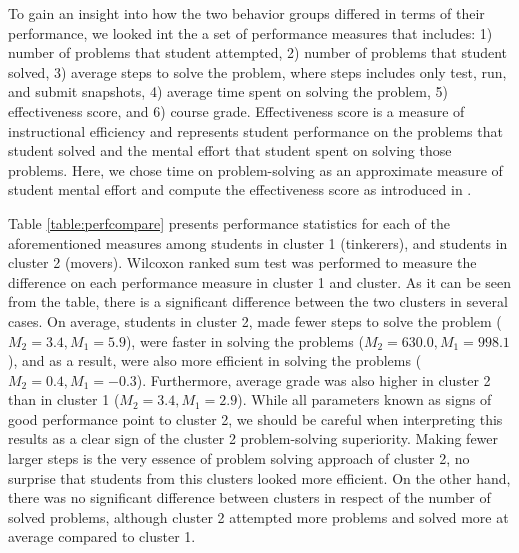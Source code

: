 \documentclass{sigchi}
\begin{document}
To gain an insight into how the two behavior groups differed in terms of their performance, we looked int the a set of performance measures that includes: 1) number of problems that student attempted, 2)  number of problems that student solved, 3) average steps to solve the problem, where steps includes only test, run, and submit snapshots, 4) average time spent on solving the problem, 5) effectiveness score, and 6) course grade. Effectiveness score is a measure of instructional efficiency and represents student performance on the problems that student solved and the mental effort that student spent on solving those problems. Here, we chose time on problem-solving as an approximate measure of student mental effort and compute the effectiveness score as introduced in \cite{paas1993efficiency}. 

Table \ref{table:perfcompare} presents performance statistics for each of the aforementioned measures among students in cluster 1 (tinkerers), and students in cluster 2 (movers).  Wilcoxon ranked sum test was performed to measure the difference on each performance measure in cluster 1 and cluster. As it can be seen from the table, there is a significant difference between the two clusters in several cases. On average, students in cluster 2, made fewer steps to solve the problem ($M_2=3.4, M_1=5.9$), were faster in solving the problems ($M_2=630.0, M_1=998.1$), and as a result, were also more efficient in solving the problems ($M_2=0.4, M_1=-0.3$). Furthermore, average grade was also higher in cluster 2 than in cluster 1 ($M_2=3.4,M_1=2.9$). While all parameters known as signs of good performance point to cluster 2, we should be careful when interpreting this results as a clear sign of the cluster 2 problem-solving superiority. Making fewer larger steps is the very essence of problem solving approach of cluster 2, no surprise that students from this clusters looked more efficient. On the other hand, there was no significant difference between clusters in respect of the number of solved problems, although cluster 2 attempted more problems and solved more at average  compared to cluster 1.
\end{document}
